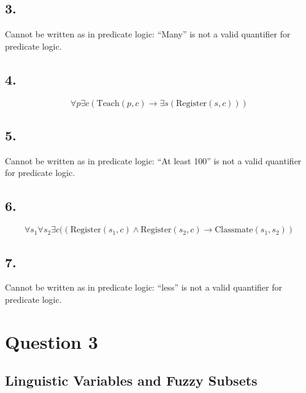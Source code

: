 \documentclass[12pt, a4paper]{article}
\begin{document}
\subsection*{3.}
Cannot be written as in predicate logic:
``Many'' is not a valid quantifier for predicate logic.

\subsection*{4.}
$$\forall p \exists c(\text{Teach}(p, c) \rightarrow \exists s(\text{Register}(s, c)))$$

\subsection*{5.}
Cannot be written as in predicate logic:
``At least 100'' is not a valid quantifier for predicate logic.

\subsection*{6.}
$$\forall s_1 \forall s_2 \exists c((\text{Register}(s_1, c) \land \text{Register}(s_2, c) \rightarrow \text{Classmate}(s_1, s_2))$$

\subsection*{7.}
Cannot be written as in predicate logic:
``less'' is not a valid quantifier for predicate logic.

\newpage
\section*{Question 3}
\subsection*{Linguistic Variables and Fuzzy Subsets}
\end{document}

